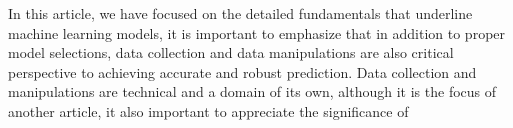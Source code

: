 
\par
In this article, we have focused on the detailed fundamentals that underline machine learning models, it is important to emphasize that in addition to proper model selections, data collection and data manipulations are also critical perspective to achieving accurate and robust prediction. Data collection and manipulations are technical and a domain of its own, although it is the focus of another article, it also important to appreciate the significance of 
\par 
